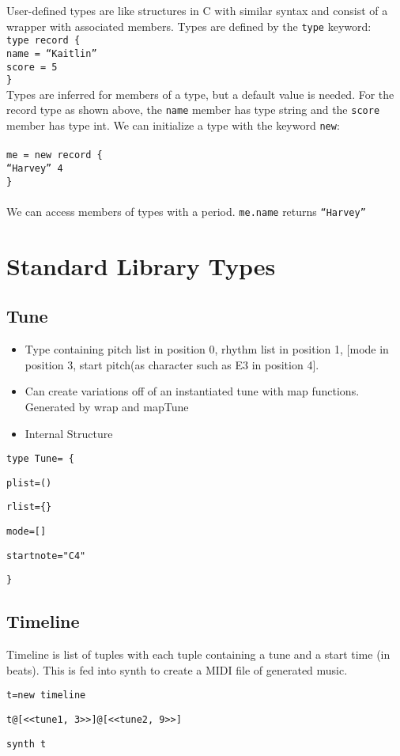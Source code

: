 \documentclass[12pt]{report}
\begin{document}
User-defined types are like structures in C with similar syntax and consist of a wrapper with associated members. Types are defined by the \texttt{type} keyword: \\
\texttt{type record \{ \\  name = ``Kaitlin'' \\   score = 5 \\ \}}\\ 
Types are inferred for members of a type, but a default value is needed. For the record type as shown above, the \texttt{name} member has type string and the \texttt{score} member has type int. We can initialize a type with the keyword \texttt{new}: \\  \\
\texttt{me = new record \{ \\ ``Harvey'' 4 \\ \}} \\ \\ 
We can access members of types with a period. 
\texttt{me.name} returns \texttt{``Harvey''}


\section{Standard Library Types}


\subsection{Tune}

\begin{itemize}
\item Type containing pitch list in position 0, rhythm list in position 1, [mode in position 3, start pitch(as character such as E3 in position 4]. 


\item Can create variations off of an instantiated tune with map functions. Generated by wrap and mapTune

\item Internal Structure

\end{itemize}

\texttt{type Tune=  \{ }

\texttt{plist=() }

\texttt{rlist=\{\}}

\texttt{mode=[]}

\texttt{startnote="C4"}

\texttt{\}}



\subsection{Timeline}

Timeline is list of tuples with each tuple containing a tune and a start time (in beats). This is fed into synth to create a MIDI file of generated music. 

\texttt{t=new timeline}

\texttt{t@[<<tune1, 3>>]@[<<tune2, 9>>]}

\texttt{synth t}
\end{document}
